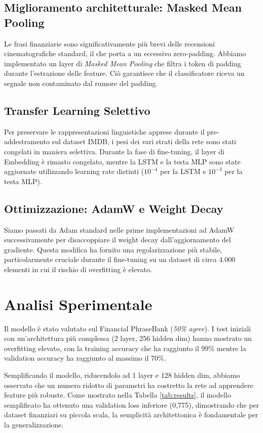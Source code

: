 \documentclass[conference]{IEEEtran}
\begin{document}
\subsection{Miglioramento architetturale: Masked Mean Pooling}
Le frasi finanziarie sono significativamente più brevi delle recensioni cinematografiche standard, il che porta a un eccessivo zero-padding. Abbiamo implementato un layer di \textit{Masked Mean Pooling} che filtra i token di padding durante l'estrazione delle feature. Ciò garantisce che il classificatore riceva un segnale non contaminato dal rumore del padding.

\subsection{Transfer Learning Selettivo}
Per preservare le rappresentazioni linguistiche apprese durante il pre-addestramento sul dataset IMDB, i pesi dei vari strati della rete sono stati congelati in maniera selettiva. Durante la fase di fine-tuning, il layer di Embedding è rimasto congelato, mentre la LSTM e la testa MLP sono state aggiornate utilizzando learning rate distinti ($10^{-4}$ per la LSTM e $10^{-3}$ per la testa MLP).

\subsection{Ottimizzazione: AdamW e Weight Decay}
Siamo passati da Adam standard nelle prime implementazioni ad AdamW successivamente per disaccoppiare il weight decay dall'aggiornamento del gradiente. Questa modifica ha fornito una regolarizzazione più stabile, particolarmente cruciale durante il fine-tuning su un dataset di circa 4.000 elementi in cui il rischio di overfitting è elevato.

\section{Analisi Sperimentale}
Il modello è stato valutato sul Financial PhraseBank (\textit{50\% agree}). I test iniziali con un'architettura più complessa (2 layer, 256 hidden dim) hanno mostrato un overfitting elevato, con la training accuracy che ha raggiunto il 99\% mentre la validation accuracy ha raggiunto al massimo il 70\%.

Semplificando il modello, riducendolo ad 1 layer e 128 hidden dim, abbiamo osservato che un numero ridotto di parametri ha costretto la rete ad apprendere feature più robuste. Come mostrato nella Tabella \ref{tab:results}, il modello semplificato ha ottenuto una validation loss inferiore (0,775), dimostrando che per dataset finanziari su piccola scala, la semplicità architettonica è fondamentale per la generalizzazione.
\end{document}
